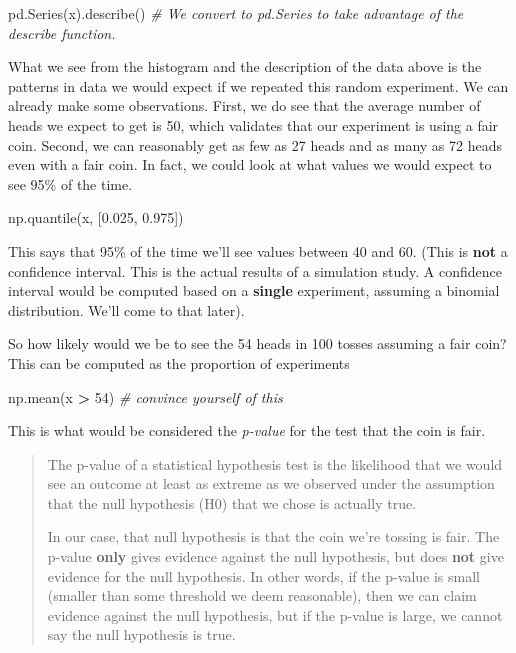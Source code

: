 \documentclass[
  letterpaper,
]{scrbook}
\newenvironment{Shaded}{\begin{snugshade}}{\end{snugshade}}
\newcommand{\CommentTok}[1]{\textcolor[rgb]{0.56,0.35,0.01}{\textit{#1}}}
\newcommand{\DecValTok}[1]{\textcolor[rgb]{0.00,0.00,0.81}{#1}}
\newcommand{\FloatTok}[1]{\textcolor[rgb]{0.00,0.00,0.81}{#1}}
\newcommand{\NormalTok}[1]{#1}
\newcommand{\OperatorTok}[1]{\textcolor[rgb]{0.81,0.36,0.00}{\textbf{#1}}}
\begin{document}
\begin{Shaded}
\begin{Highlighting}[]
\NormalTok{pd.Series(x).describe() }\CommentTok{\# We convert to pd.Series to take advantage of the \textasciigrave{}describe\textasciigrave{} function.}
\end{Highlighting}
\end{Shaded}

What we see from the histogram and the description of the data above is the patterns in data we would expect if we repeated this random experiment. We can already make some observations. First, we do see that the average number of heads we expect to get is 50, which validates that our experiment is using a fair coin. Second, we can reasonably get as few as 27 heads and as many as 72 heads even with a fair coin. In fact, we could look at what values we would expect to see 95\% of the time.

\begin{Shaded}
\begin{Highlighting}[]
\NormalTok{np.quantile(x, [}\FloatTok{0.025}\NormalTok{, }\FloatTok{0.975}\NormalTok{])}
\end{Highlighting}
\end{Shaded}

This says that 95\% of the time we'll see values between 40 and 60. (This is \textbf{not} a confidence interval. This is the actual results of a simulation study. A confidence interval would be computed based on a \textbf{single} experiment, assuming a binomial distribution. We'll come to that later).

So how likely would we be to see the 54 heads in 100 tosses assuming a fair coin? This can be computed as the proportion of experiments

\begin{Shaded}
\begin{Highlighting}[]
\NormalTok{np.mean(x }\OperatorTok{\textgreater{}} \DecValTok{54}\NormalTok{) }\CommentTok{\# convince yourself of this}
\end{Highlighting}
\end{Shaded}

This is what would be considered the \emph{p-value} for the test that the coin is fair.

\begin{quote}
The p-value of a statistical hypothesis test is the likelihood that we would see an outcome at least as extreme as we observed under the assumption that the null hypothesis (H0) that we chose is actually true.

In our case, that null hypothesis is that the coin we're tossing is fair. The p-value \textbf{only} gives evidence against the null hypothesis, but does \textbf{not} give evidence for the null hypothesis. In other words, if the p-value is small (smaller than some threshold we deem reasonable), then we can claim evidence against the null hypothesis, but if the p-value is large, we cannot say the null hypothesis is true.
\end{quote}
\end{document}
